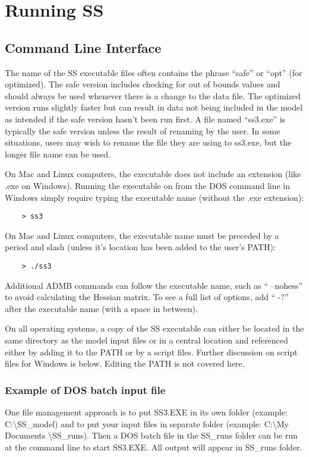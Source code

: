 \section{Running SS}\label{RunningSS}

\subsection{Command Line Interface}
The name of the SS executable files often contains the phrase “safe” or “opt” (for optimized). The safe version includes checking for out of bounds values and should always be used whenever there is a change to the data file. The optimized version runs slightly faster but can result in data not being included in the model as intended if the safe version hasn’t been run first. A file named “ss3.exe” is typically the safe version unless the result of renaming by the user. In some situations, users may wish to rename the file they are using to ss3.exe, but the longer file name can be used.

On Mac and Linux computers, the executable does not include an extension (like .exe on Windows).
Running the executable on from the DOS command line in Windows simply require typing the executable name (without the .exe extension):

\begin{verbatim}
	> ss3
\end{verbatim}


On Mac and Linux computers, the executable name must be preceded by a period and slash (unless it’s location has been added to the user’s PATH):

\begin{verbatim}
	> ./ss3
\end{verbatim}

Additional ADMB commands can follow the executable name, such as “ –nohess” to avoid calculating the Hessian matrix. To see a full list of options, add “ -?” after the executable name (with a space in between).

On all operating systems, a copy of the SS executable can either be located in the same directory as the model input files or in a central location and referenced either by adding it to the PATH or by a script files. Further discussion on script files for Windows is below. Editing the PATH is not covered here.


\subsubsection{Example of DOS batch input file}
One file management approach is to put SS3.EXE in its own folder (example:  C:\textbackslash SS\_model) and to put your input files in separate folder (example:  C:\textbackslash My Documents \textbackslash SS\_runs).  Then a DOS batch file in the SS\_runs folder can be run at the command line to start SS3.EXE.  All output will appear in SS\_runs folder.

